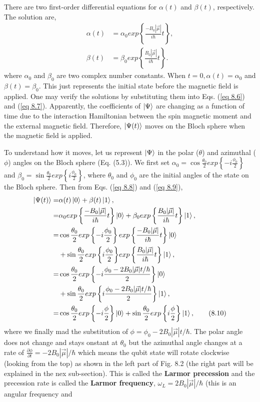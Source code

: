 \documentclass{article}
\begin{document}
There are two first-order differential equations for $\alpha(t)$ and $\beta(t)$, respectively.
The solution are,
\begin{align*}
    \label{eq 8.8}\alpha(t)&=\alpha_0exp\left\{\frac{-B_0|\vec{\mu}|}{i\hbar}t\right\},\tag{8.8}\\
    \label{eq 8.9}\beta(t)&=\beta_0exp\left\{\frac{B_0|\vec{\mu}|}{i\hbar}t\right\}. \tag{8.9}
\end{align*}
where $\alpha_0$ and $\beta_0$ are two complex number constants. When $t=0, \alpha(t)=\alpha_0$ and $\beta(t)=\beta_0$.
This just represents the initial state before the magnetic field is applied. One may verify the solutions
by substituting them into Eqs. (\ref{eq 8.6}) and (\ref{eq 8.7}).
Apparently, the coefficients of $\ket{\Psi}$ are changing as a function of time due to the interaction
Hamiltonian between the spin magnetic moment and the external magnetic field. Therefore,
$\ket{\Psi(t)}$ moves on the Bloch sphere when the magnetic field is applied.

To understand how it moves, let us represent $\ket{\Psi}$ in the polar ($\theta$) and
azimuthal ($\phi$) angles on the Bloch sphere (Eq. (5.3)). We first set $\alpha_0=\cos{\frac{\theta_0}{2}exp\left\{-i\frac{\phi_0}{2}\right\}}$
and $\beta_0=\sin{\frac{\theta_0}{2}exp\left\{i\frac{\phi_0}{2}\right\}}$, where $\theta_0$ and
$\phi_0$ are the initial angles of the state on the Bloch sphere. Then from Eqs. (\ref{eq 8.8}) and
(\ref{eq 8.9}),
\begin{align*} \label{eq 8.10}
    \Ket{\Psi(t)}=&\alpha(t)\ket{0}+\beta(t)\ket{1},\\
    =&\alpha_0exp\left\{\frac{-B_0|\vec{\mu}|}{i\hbar}t\right\}\ket{0}+
    \beta_0exp\left\{\frac{B_0|\vec{\mu}|}{i\hbar}t\right\}\ket{1},\\
    =&\cos{\frac{\theta_0}{2}}exp\left\{-i\frac{\phi_0}{2}\right\}exp\left\{\frac{-B_0|\vec{\mu}|}{i\hbar}t\right\}\ket{0}\\
    &+\sin{\frac{\theta_0}{2}exp\left\{i\frac{\phi_0}{2}\right\}}exp\left\{\frac{B_0|\vec{\mu}|}{i\hbar}t\right\}\ket{1},\\
    =&\cos{\frac{\theta_0}{2}}exp\left\{-i\frac{\phi_0-2B_0|\vec{\mu}|t/\hbar}{2}\right\}\ket{0}\\
    &+\sin{\frac{\theta_0}{2}}exp\left\{i\frac{\phi_0-2B_0|\vec{\mu}|t/\hbar}{2}\right\}\ket{1},\\
    =&\cos{\frac{\theta_0}{2}}exp\left\{-i\frac{\phi}{2}\right\}\ket{0}+\sin{\frac{\theta_0}{2}}exp\left\{i\frac{\phi}{2}\right\}\ket{1},\tag{8.10}
\end{align*}
where we finally mad the substitution of $\phi=\phi_0-2B_0|\vec{\mu}|t/\hbar$. The polar angle does not
change and stays onstant at $\theta_0$ but the azimuthal angle changes at a rate of 
$\frac{\partial\phi}{\partial t}= -2B_0|\vec{\mu}|/\hbar$ which means the qubit state will rotate
clockwise (looking from the top) as shown in the left part of Fig. 8.2 (the right part will be explained in the nex sub-section).
This is called the \textbf{Larmor precession} and the precession rate is called the 
\textbf{Larmor frequency}, $\omega_L=2B_0|\vec{\mu}|/\hbar$ (this is an angular frequency and\\
\end{document}
